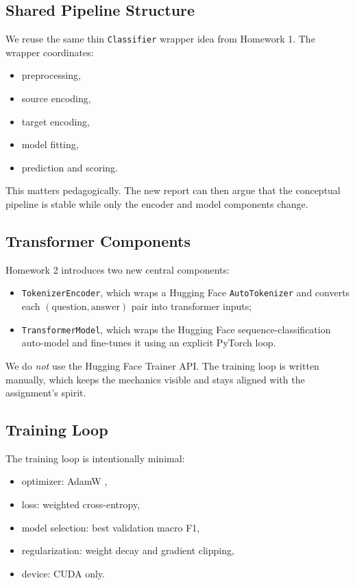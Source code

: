 \subsection{Shared Pipeline Structure}

We reuse the same thin \texttt{Classifier} wrapper idea from Homework 1. The wrapper coordinates:
\begin{itemize}
	\item preprocessing,
	\item source encoding,
	\item target encoding,
	\item model fitting,
	\item prediction and scoring.
\end{itemize}

This matters pedagogically. The new report can then argue that the conceptual pipeline is stable while only the encoder and model components change.

\subsection{Transformer Components}

Homework 2 introduces two new central components:
\begin{itemize}
	\item \texttt{TokenizerEncoder}, which wraps a Hugging Face \texttt{AutoTokenizer} and converts each $(\text{question}, \text{answer})$ pair into transformer inputs;
	\item \texttt{TransformerModel}, which wraps the Hugging Face sequence-classification auto-model and fine-tunes it using an explicit PyTorch loop.
\end{itemize}

We do \emph{not} use the Hugging Face Trainer API. The training loop is written manually, which keeps the mechanics visible and stays aligned with the assignment's spirit.

\subsection{Training Loop}

The training loop is intentionally minimal:
\begin{itemize}
	\item optimizer: AdamW \cite{adamw},
	\item loss: weighted cross-entropy,
	\item model selection: best validation macro F1,
	\item regularization: weight decay and gradient clipping,
	\item device: CUDA only.
\end{itemize}

